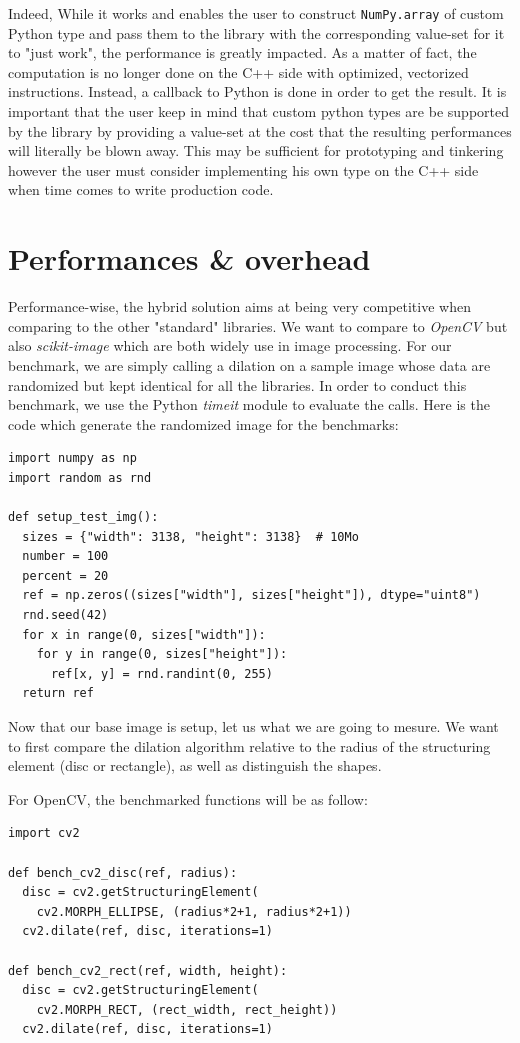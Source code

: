 Indeed, While it works and enables the user to construct \texttt{NumPy.array} of custom Python type and pass them to the
library with the corresponding value-set for it to "just work", the performance is greatly impacted. As a matter of
fact, the computation is no longer done on the C++ side with optimized, vectorized instructions. Instead, a callback to
Python is done in order to get the result. It is important that the user keep in mind that custom python types are be
supported by the library by providing a value-set at the cost that the resulting performances will literally be blown
away. This may be sufficient for prototyping and tinkering however the user must consider implementing his own type on
the C++ side when time comes to write production code.

\section{Performances \& overhead}

Performance-wise, the hybrid solution aims at being very competitive when comparing to the other "standard" libraries.
We want to compare to \emph{OpenCV} but also \emph{scikit-image} which are both widely use in image processing. For our
benchmark, we are simply calling a dilation on a sample image whose data are randomized but kept identical for all the
libraries. In order to conduct this benchmark, we use the Python \emph{timeit} module to evaluate the calls. Here is the
code which generate the randomized image for the benchmarks:
\begin{verbatim}
import numpy as np
import random as rnd

def setup_test_img():
  sizes = {"width": 3138, "height": 3138}  # 10Mo
  number = 100
  percent = 20
  ref = np.zeros((sizes["width"], sizes["height"]), dtype="uint8")
  rnd.seed(42)
  for x in range(0, sizes["width"]):
    for y in range(0, sizes["height"]):
      ref[x, y] = rnd.randint(0, 255)
  return ref
\end{verbatim}

Now that our base image is setup, let us what we are going to mesure. We want to first compare the dilation algorithm
relative to the radius of the structuring element (disc or rectangle), as well as distinguish the shapes.

For OpenCV, the benchmarked functions will be as follow:
\begin{verbatim}
import cv2

def bench_cv2_disc(ref, radius):
  disc = cv2.getStructuringElement(
    cv2.MORPH_ELLIPSE, (radius*2+1, radius*2+1))
  cv2.dilate(ref, disc, iterations=1)

def bench_cv2_rect(ref, width, height):
  disc = cv2.getStructuringElement(
    cv2.MORPH_RECT, (rect_width, rect_height))
  cv2.dilate(ref, disc, iterations=1)
\end{verbatim}

